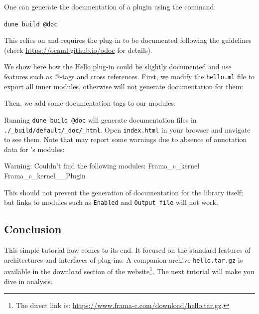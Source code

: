 One can generate the documentation of a plugin using the command:

\lstinline{dune build @doc}

This relies on \odoc and requires the plug-in to be documented following the
\odoc guidelines (check \url{https://ocaml.github.io/odoc} for details).

We show here how the Hello plug-in could be slightly documented and use
\odoc features such as @-tags and cross references. First, we modify the
\texttt{hello.ml} file to export all inner modules, otherwise \odoc will not
generate documentation for them:


Then, we add some documentation tags to our modules:




Running \verb|dune build @doc| will generate documentation files in
\texttt{./\_build/default/\_doc/\_html}. Open \texttt{index.html} in your
browser and navigate to see them. Note that \odoc may report some warnings
due to absence of annotation data for \framac's modules:

\begin{shell}
Warning: Couldn't find the following modules:
  Frama_c_kernel Frama_c_kernel__Plugin
\end{shell}

This should not prevent the generation of documentation for the library itself;
but links to modules such as \texttt{Enabled} and \texttt{Output\_file} will
not work.

\subsection{Conclusion}

This simple tutorial now comes to its end. It focused on the standard features
of architectures and interfaces of \framac plug-ins. A companion archive
\texttt{hello.tar.gz} is available in the download section of the \framac
website\footnote{The direct link is:
\url{https://www.frama-c.com/download/hello.tar.gz}.}.
The next tutorial will make you dive in \C analysis.

